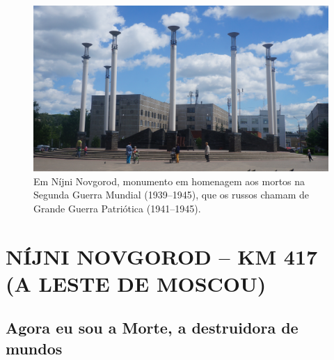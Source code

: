 \pagebreak
\clearpage
\thispagestyle{empty}

\movetoevenpage
\begin{absolutelynopagebreak}
\begin{vplace}
\begin{figure}[H]
\begin{adjustwidth}{-2.7cm}{}
  \vspace{2.7cm}
  \hspace{-0.5cm}
  \includegraphics[width=150mm]{./imgs/nijni1.jpg}  
\end{adjustwidth}
  \caption{Em Níjni Novgorod, monumento em homenagem aos mortos na Segunda Guerra Mundial (1939--1945), que os russos chamam de Grande Guerra Patriótica (1941--1945).}

\thispagestyle{empty}

\end{figure}
\end{vplace}

\end{absolutelynopagebreak}


\movetooddpage
{}
\part*{NÍJNI NOVGOROD -- KM 417\\(A LESTE DE MOSCOU)}



\chapter*{Agora eu sou a Morte, a destruidora de mundos}

